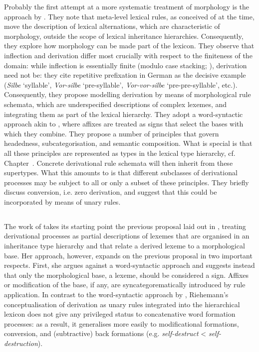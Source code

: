 \documentclass[output=paper
	        ,collection
	        ,collectionchapter
 	        ,biblatex
                ,babelshorthands
                ,newtxmath
                ,draftmode
                ,colorlinks, citecolor=brown
]{langscibook}
\begin{document}
Probably the first attempt at a more systematic treatment of
morphology is the approach by \citet{Krieger:Nerbonne:93}. They note
that meta-level lexical rules, as conceived of at the time, move the
description of lexical alternations, which are characteristic of
morphology, outside the scope of lexical inheritance
hierarchies. Consequently, they explore how morphology can be made
part of the lexicon. They observe that inflection and derivation
differ most crucially with respect to the finiteness of the domain:
while inflection is essentially finite (modulo case stacking;
\citealp{Sadler06,malouf:head-driven}), derivation need not be:
they cite repetitive prefixation in German as the decisive example
(\textit{Silbe} `syllable', \textit{Vor-silbe} `pre-syllable',
\textit{Vor-vor-silbe} `pre-pre-syllable', etc.). Consequently, they
propose  modelling derivation by means of morphological rule schemata,
which are underspecified descriptions of complex lexemes, and
integrating them as part of the lexical hierarchy. They adopt a
word-syntactic approach akin to \citet{Lieber92}, where affixes are
treated as signs that select the bases with which they combine. They
propose a number of principles that govern headedness,
subcategorisation, and semantic composition. What is special is that
all these principles are represented as types in the lexical type
hierarchy, cf. Chapter~. Concrete
derivational rule schemata will then inherit from these
supertypes. What this amounts to is that different subclasses of
derivational processes may be subject to all or only a subset of these
principles. They briefly discuss conversion, i.e. zero derivation, and
suggest that this could be incorporated by means of unary rules.



\subsection{\protect\citet{Riehemann98}}

The work of \citet{Riehemann98} takes its starting point the
previous proposal laid out in \citet{Krieger:Nerbonne:93}, treating
derivational processes as partial descriptions of lexemes that are
organised in an inheritance type hierarchy and that relate a derived
lexeme to a morphological base.  Her approach, however, expands on the
previous proposal in two important respects. First, she argues against
a word-syntactic approach and suggests instead that only the
morphological base, a lexeme, should be considered a sign. Affixes or
modification of the base, if any, are syncategorematically introduced
by rule application. In contrast to the word-syntactic approach by
\citet{Krieger:Nerbonne:93}, Riehemann's conceptualisation of
derivation as unary rules integrated into the hierarchical lexicon
does not give any privileged status to concatenative word formation
processes: as a result, it generalises more easily to modificational
formations, conversion, and  (subtractive) back formations
(e.g. \textit{self-destruct} < \textit{self-destruction}). 
\end{document}
